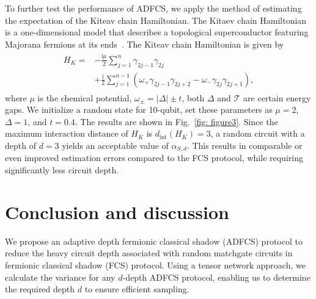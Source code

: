 \documentclass[showpacs,twocolumn,aps,prx,long bibliography,superscriptaddress,notitlepage]{revtex4-1}
\newcommand{\ii}{\mathsf{i}}
\newcommand{\Tcal}{\mathcal{T}}
\newcommand{\Mbb}{\mathbb{M}}
\begin{document}
To further test the performance of ADFCS, we apply the method of estimating the expectation of the Kiteav chain Hamiltonian. The Kitaev chain Hamiltonian is a one-dimensional model that describes a topological superconductor featuring Majorana fermions at its ends~\cite{kitaev2001unpaired}. The Kiteav chain Hamiltonian is given by
\begin{align}
\begin{aligned}
        H_K =& -\frac{\ii \mu}{2} \sum_{j=1}^n \gamma_{2j-1}\gamma_{2j} \\
    &+ \frac{\ii}{2}\sum_{j=1}^{n-1} \left( \omega_+ \gamma_{2j-1}\gamma_{2j+2} - \omega_- \gamma_{2j}\gamma_{2j+1} \right),
\end{aligned}
\end{align}
where $\mu$ is the chemical potential, $\omega_{ \pm}=|\Delta| \pm t$, both $\Delta$ and $\Tcal$ are certain energy gaps. We initialize a random state for 10-qubit, set these parameters as $\mu = 2 $, $\Delta = 1$, and $t=0.4$. The results are shown in Fig.~\ref{fig: figure3}. Since the maximum interaction distance of $H_K$ is $d_\text{int}(H_K) = 3$, a random circuit with a depth of $d = 3$ yields an acceptable value of $\alpha_{S,d}$. This results in comparable or even improved estimation errors compared to the FCS protocol, while requiring significantly less circuit depth.


\section{Conclusion and discussion}
\label{sec: conclusion}
We propose an adaptive depth fermionic classical shadow (ADFCS) protocol to reduce the heavy circuit depth associated with random matchgate circuits in fermionic classical shadow (FCS) protocol. Using a tensor network approach, we calculate the variance for any $d$-depth ADFCS protocol, enabling us to determine the required depth $d$ to ensure efficient sampling. 
\end{document}

